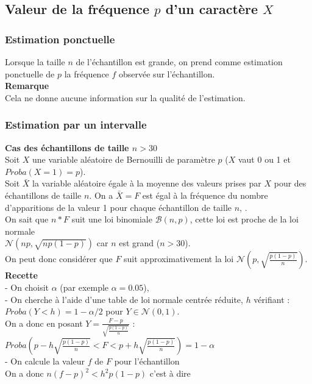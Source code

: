 \documentclass[a4paper,11pt]{book}
\begin{document}
\subsection{Valeur de la fr\'equence  $p$ d'un caract\`ere $X$}
\subsubsection{Estimation ponctuelle}
Lorsque la taille $n$ de l'\'echantillon est grande, on prend comme estimation 
ponctuelle de $p$ la fr\'equence $f$ observ\'ee sur l'\'echantillon.\\
{\bf Remarque}\\
Cela ne donne aucune information sur la qualit\'e de l'estimation. 
\subsubsection{Estimation par un intervalle}
{\bf Cas des \'echantillons de taille $n>30$}\\
Soit $X$ une variable al\'eatoire de Bernouilli de param\`etre $p$ ($X$ vaut 0 
ou 1 et $Proba(X=1)=p$).\\
Soit $\bar X$ la variable al\'eatoire \'egale \`a la moyenne des valeurs prises
par $X$ pour des \'echantillons de taille $n$. 
On a $\bar X=F$ est \'egal \`a la fr\'equence du nombre d'apparitions de la 
valeur 1 pour chaque \'echantillon de taille $n$, .\\
On sait que $n*F$ suit une loi binomiale $\mathcal B(n,p)$, cette loi est
 proche de la loi normale \\
 $\mathcal N(np,\sqrt{np(1-p)})$ car $n$ est grand ($n>30$).\\
On peut donc consid\'erer que $F$ suit approximativement la loi 
$\mathcal N(p,\sqrt{\frac{p(1-p)}{n}})$.\\
{\bf Recette}\\
- On choisit $\alpha$ (par exemple $\alpha=0.05$),\\
- On cherche \`a l'aide d'une table de loi normale centr\'ee r\'eduite,
$h$ v\'erifiant :\\
$Proba(Y<h)=1-\alpha/2$ pour $Y\in \mathcal N(0,1)$.\\
On a donc en posant $Y=\frac{F-p}{\sqrt{\frac{p(1-p)}{n}}}$ :\\
$Proba(p-h \sqrt{\frac{p(1-p)}{n}}<F<p+h \sqrt{\frac{p(1-p)}{n}} )=1-\alpha$\\
- On calcule la valeur $f$ de $F$ pour l'\'echantillon\\
On a donc $n(f-p)^2<h^2p(1-p)$ c'est \`a dire 
\end{document}

